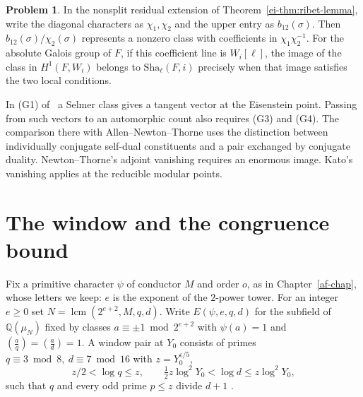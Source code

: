 \documentclass[reqno]{amsart}
\newcounter{chap}
\theoremstyle{definition}
\newtheorem{problem}{Problem}[section]
\theoremstyle{plain}
\newcommand{\Q}{\mathbb Q}
\newcommand{\Sha}{\mathrm{Sha}}
\begin{document}
\begin{problem}\label{pr:ribet}
In the nonsplit residual extension of Theorem~\ref{ei-thm:ribet-lemma}, write the diagonal characters as \(\chi_1,\chi_2\) and the upper entry as \(b_{12}(\sigma)\).  Then \(b_{12}(\sigma)/\chi_2(\sigma)\) represents a nonzero class with coefficients in \(\chi_1\chi_2^{-1}\).  For the absolute Galois group of \(F\), if this coefficient line is \(W_i[\ell]\), the image of the class in \(H^1(F,W_i)\) belongs to \(\Sha_\ell(F,i)\) precisely when that image satisfies the two local conditions.
\end{problem}

In (G1) of~\cite[\S17.4]{Adr} a Selmer class gives a tangent vector at the Eisenstein point.  Passing from such vectors to an automorphic count also requires (G3) and (G4).  The comparison there with Allen--Newton--Thorne uses the distinction between individually conjugate self-dual constituents and a pair exchanged by conjugate duality.  Newton--Thorne's adjoint vanishing requires an enormous image.  Kato's vanishing applies at the reducible modular points.

\section{The window and the congruence bound}\label{sec:window}
Fix a primitive character \(\psi\) of conductor \(M\) and order \(o\), as in Chapter~\ref{af-chap}, whose letters we keep: \(e\) is the exponent of the \(2\)-power tower.  For an integer \(e\ge0\) set \(N=\operatorname{lcm}(2^{e+2},M,q,d)\).  Write \(E(\psi,e,q,d)\) for the subfield of \(\Q(\mu_N)\) fixed by classes \(a\equiv\pm1\bmod 2^{e+2}\) with \(\psi(a)=1\) and \((\frac aq)=(\frac ad)=1\).  A window pair at \(Y_0\) consists of primes \(q\equiv3\bmod8,\ d\equiv7\bmod16\) with \(z=Y_0^{\varepsilon/5}\),
\[
 z/2<\log q\le z,\qquad
 \tfrac12z\log^2Y_0<\log d\le z\log^2Y_0,
\]
such that \(q\) and every odd prime \(p\le z\) divide \(d+1\) \cite[Defs.~17.9--17.10]{Adr}.
\end{document}
